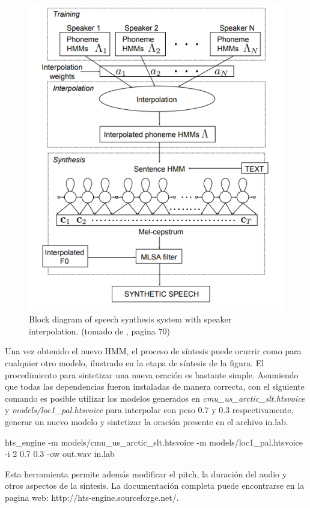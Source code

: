 \begin{figure}
\begin{center}
\includegraphics[scale=0.4]{imagenes/speakerInterpolation.png}
\caption{Block diagram of speech synthesis system with speaker interpolation. (tomado de \cite{phoneticAndProsodic}, pagina $70$) }
\label{spekerInterpolationImagen}
\end{center}
\end{figure}

Una vez obtenido el nuevo HMM, el proceso de síntesis puede ocurrir como para cualquier otro modelo, ilustrado en la etapa de síntesis de la figura. El procedimiento para sintetizar una nueva oración es bastante simple. Asumiendo que todas las dependencias fueron instaladas de manera correcta, con el siguiente comando es posible utilizar los modelos generados en \textit{cmu\_us\_arctic\_slt.htsvoice} y \textit{models/loc1\_pal.htsvoice} para interpolar con peso $0.7$ y $0.3$ respectivamente, generar un nuevo modelo y sintetizar la oración presente en el archivo in.lab.

\begin{tcolorbox}
hts\_engine -m models/cmu\_us\_arctic\_slt.htsvoice -m models/loc1\_pal.htsvoice -i 2 0.7 0.3 -ow out.wav in.lab
\end{tcolorbox}

Esta herramienta permite además modificar el pitch, la duración del audio y otros aspectos de la síntesis. La documentación completa puede encontrarse en la pagina web: http://hts-engine.sourceforge.net/.